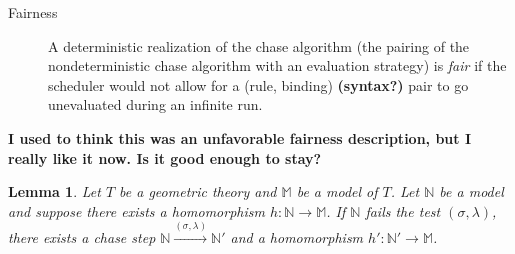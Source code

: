
		\label{fairness_definition}
		\begin{description}
		\item [Fairness] A deterministic realization of the chase algorithm
		(the pairing of the nondeterministic chase algorithm with an evaluation
		strategy) is \emph{fair} if the scheduler would not allow for a (rule,
		binding) \textbf{(syntax?)} pair to go unevaluated during an infinite run.
		\end{description}

		\textbf{I used to think this was an unfavorable fairness description, but I really like it now. Is it good enough to stay?}

		\newtheorem{chase_lemma}{Lemma}
		\begin{chase_lemma}
			Let $T$ be a geometric theory and $\mathbb{M}$ be a model of $T$.
			Let $\mathbb{N}$ be a model and suppose there exists a homomorphism
			$h : \mathbb{N} \to \mathbb{M}$. If $\mathbb{N}$ fails the test
			$(\sigma,\lambda)$, there exists a chase step $\mathbb{N}
			\xrightarrow{(\sigma,\lambda)} \mathbb{N}'$ and a homomorphism $h'
			: \mathbb{N}' \to \mathbb{M}$.
		\end{chase_lemma}
